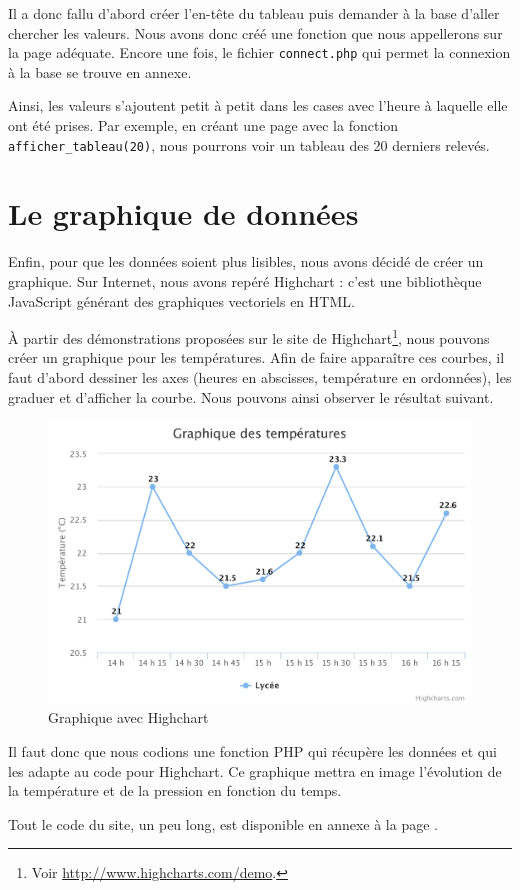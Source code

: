 Il a donc fallu d'abord créer l'en-tête du tableau puis demander à la base d'aller chercher les valeurs. Nous avons donc créé une fonction que nous appellerons sur la page adéquate. Encore une fois, le fichier \verb-connect.php- qui permet la connexion à la base se trouve en annexe.

Ainsi, les valeurs s'ajoutent petit à petit dans les cases avec l'heure à laquelle elle ont été prises. Par exemple, en créant une page avec la fonction \verb-afficher_tableau(20)-, nous pourrons voir un tableau des 20 derniers relevés.

\section{Le graphique de données}

Enfin, pour que les données soient plus lisibles, nous avons décidé de créer un graphique. Sur Internet, nous avons repéré Highchart : c'est une bibliothèque JavaScript générant des graphiques vectoriels en HTML.

À partir des démonstrations proposées sur le site de Highchart\footnote{Voir \url{http://www.highcharts.com/demo}.}, nous pouvons créer un graphique pour les températures. Afin de faire apparaître ces courbes, il faut d'abord dessiner les axes (heures en abscisses, température en ordonnées), les graduer et d'afficher la courbe.
Nous pouvons ainsi observer le résultat suivant.

\begin{figure}[!h]
	\centering
	\includegraphics[width=.6\linewidth]{Images/Exemple_graphique}
	\caption{Graphique avec Highchart}
\end{figure}

Il faut donc que nous codions une fonction PHP qui récupère les données et qui les adapte au code pour Highchart. Ce graphique mettra en image l'évolution de la température et de la pression en fonction du temps.

Tout le code du site, un peu long, est disponible en annexe à la page \pageref{code:site}.
